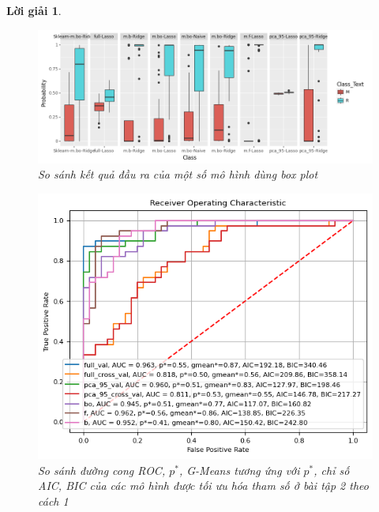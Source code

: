 \documentclass[14pt, a4paper]{article}
\theoremstyle{sltheorem}
\theoremstyle{soltheorem}
\newtheorem*{loigiai}{Lời giải}
\begin{document}
\begin{loigiai}
    \begin{figure}[h!]
        \centering
        \includegraphics[width=1.0\textwidth]{figures/prob_box_plot.png}
        \caption{So sánh kết quả đầu ra của một số mô hình dùng box plot}
        \label{fig:prob_box_plot}
    \end{figure}

    \begin{figure}[h!]
        \centering
        \includegraphics[width=1.0\textwidth]{figures/ROC_Curve_AIC_BIC_Excercise_2_1.png}
        \caption{ So sánh đường cong ROC, $p^*$, G-Means tương ứng với $p^*$, chỉ số AIC, BIC của các mô hình được tối ưu hóa tham số ở bài tập 2 theo cách 1}
        \label{fig:ROC_Curve_AIC_BIC_Excercise_2_1}
    \end{figure}


\end{loigiai}
\end{document}
